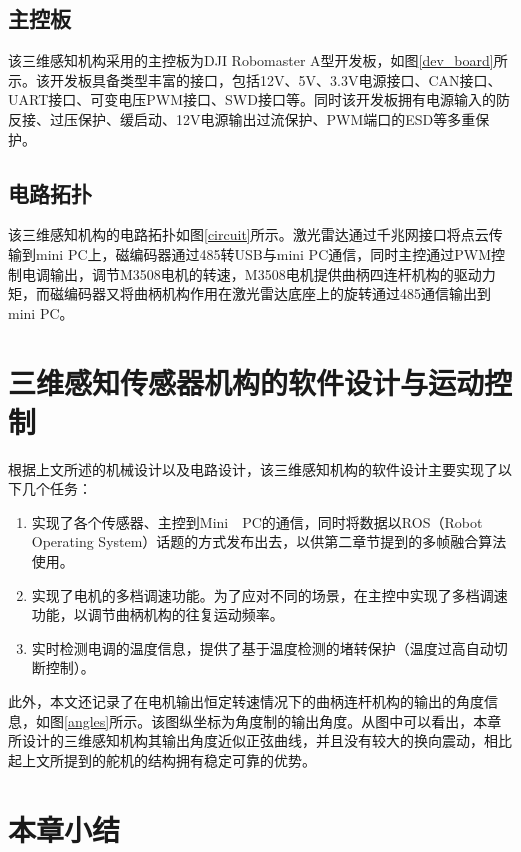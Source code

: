\subsection{主控板}
该三维感知机构采用的主控板为DJI Robomaster A型开发板，如图\ref{dev_board}所示。该开发板具备类型丰富的接口，包括12V、5V、3.3V电源接口、CAN接口、UART接口、可变电压PWM接口、SWD接口等。同时该开发板拥有电源输入的防反接、过压保护、缓启动、12V电源输出过流保护、PWM端口的ESD等多重保护。

\subsection{电路拓扑}
该三维感知机构的电路拓扑如图\ref{circuit}所示。激光雷达通过千兆网接口将点云传输到mini PC上，磁编码器通过485转USB与mini PC通信，同时主控通过PWM控制电调输出，调节M3508电机的转速，M3508电机提供曲柄四连杆机构的驱动力矩，而磁编码器又将曲柄机构作用在激光雷达底座上的旋转通过485通信输出到mini PC。

\section{三维感知传感器机构的软件设计与运动控制}

根据上文所述的机械设计以及电路设计，该三维感知机构的软件设计主要实现了以下几个任务：

\begin{enumerate}
    \item 实现了各个传感器、主控到Mini　PC的通信，同时将数据以ROS（Robot Operating System）话题的方式发布出去，以供第二章节提到的多帧融合算法使用。
    \item 实现了电机的多档调速功能。为了应对不同的场景，在主控中实现了多档调速功能，以调节曲柄机构的往复运动频率。
    \item 实时检测电调的温度信息，提供了基于温度检测的堵转保护（温度过高自动切断控制）。
\end{enumerate}

此外，本文还记录了在电机输出恒定转速情况下的曲柄连杆机构的输出的角度信息，如图\ref{angles}所示。该图纵坐标为角度制的输出角度。从图中可以看出，本章所设计的三维感知机构其输出角度近似正弦曲线，并且没有较大的换向震动，相比起上文所提到的舵机的结构拥有稳定可靠的优势。


\section{本章小结}

